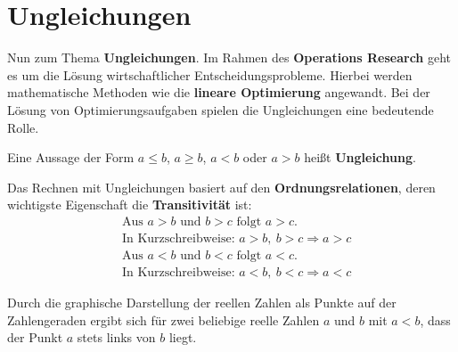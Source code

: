\section{Ungleichungen}

Nun zum Thema \textbf{Ungleichungen}. Im Rahmen des \textbf{Operations Research} geht es um die Lösung wirtschaftlicher Entscheidungsprobleme. Hierbei werden mathematische Methoden wie die \textbf{lineare Optimierung} angewandt. Bei der Lösung von Optimierungsaufgaben spielen die Ungleichungen eine bedeutende Rolle.

Eine Aussage der Form $a \leq b$, $a \geq b$, $a < b$ oder $a > b$ heißt \textbf{Ungleichung}.

Das Rechnen mit Ungleichungen basiert auf den \textbf{Ordnungsrelationen}, deren wichtigste Eigenschaft die \textbf{Transitivität} ist:
\begin{align*}
  &\text{Aus } a > b \text{ und } b > c \text{ folgt } a > c .\\
  &\text{In Kurzschreibweise: } a > b,\ b > c \Rightarrow a > c\\
  &\text{Aus } a < b \text{ und } b < c \text{ folgt } a < c .\\
  &\text{In Kurzschreibweise: } a < b,\ b < c \Rightarrow a < c
\end{align*}

Durch die graphische Darstellung der reellen Zahlen als Punkte auf der Zahlengeraden ergibt sich für zwei beliebige reelle Zahlen $a$ und $b$ mit $a < b$, dass der Punkt $a$ stets links von $b$ liegt.

\begin{center}
\end{center}

